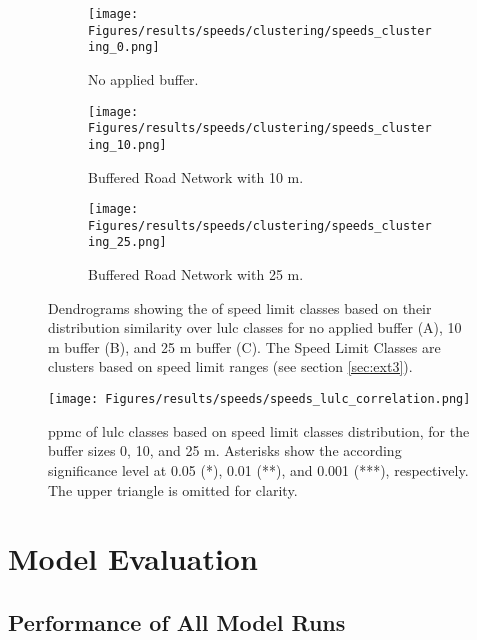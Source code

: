 \begin{figure}[!htb]
    \centering
    \begin{subfigure}{.85\textwidth}
        \centering
        \texttt{[image: Figures/results/speeds/clustering/speeds\_clustering\_0.png]}
        \caption{No applied buffer.}
    \end{subfigure}
    \begin{subfigure}{.85\textwidth}
        \centering
        \texttt{[image: Figures/results/speeds/clustering/speeds\_clustering\_10.png]}
        \caption{Buffered Road Network with 10 m.}
    \end{subfigure}
    \begin{subfigure}{.85\textwidth}
        \centering
        \texttt{[image: Figures/results/speeds/clustering/speeds\_clustering\_25.png]}
        \caption{Buffered Road Network with 25 m.}
    \end{subfigure}
    \caption[]{Dendrograms showing the  of speed limit classes based on their distribution similarity over \gls{lulc} classes for no applied buffer (A), 10 m buffer (B), and 25 m buffer (C). The Speed Limit Classes are clusters based on speed limit ranges (see section \ref{sec:ext3}).}
    \label{app_fig:speeds_dendrograms}
\end{figure}

\clearpage

\begin{figure}[!htb]
    \centering
    \texttt{[image: Figures/results/speeds/speeds\_lulc\_correlation.png]}
    \caption[ of  Classes Based on Buffered Speed Limit Classes]{\gls{ppmc} of \gls{lulc} classes based on speed limit classes distribution, for the buffer sizes 0, 10, and 25 m. Asterisks show the according significance level at 0.05 (*), 0.01 (**), and 0.001 (***), respectively. The upper triangle is omitted for clarity.}
    \label{app_fig:speeds_correlation}
\end{figure}

\clearpage

\section{Model Evaluation}
\label{app:evaluation}

\subsection{Performance of All Model Runs}
\label{app:performance}

